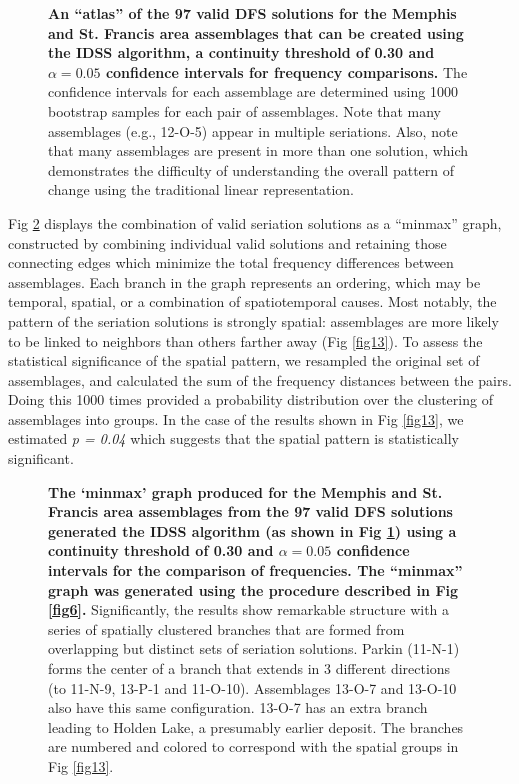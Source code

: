 \documentclass[10pt,letterpaper]{article}
\begin{document}
\begin{figure}[h]
\caption{{\bf An ``atlas'' of the 97 valid DFS solutions for the Memphis and St. Francis area assemblages that can be created using the IDSS algorithm, a continuity threshold of 0.30 and $\alpha = 0.05$ confidence intervals for frequency comparisons.} The confidence intervals for each assemblage are determined using 1000 bootstrap samples for each pair of assemblages. Note that many assemblages (e.g., 12-O-5) appear in multiple seriations.  Also, note that many assemblages are present in more than one solution, which demonstrates the difficulty of understanding the overall pattern of change using the traditional linear representation.}
\label{fig11}
\end{figure}

Fig \ref{fig12} displays the combination of valid seriation solutions as a ``minmax'' graph, constructed by combining individual valid solutions and retaining those connecting edges which minimize the total frequency differences between assemblages. Each branch in the graph represents an ordering, which may be temporal, spatial, or a combination of spatiotemporal causes.  Most notably, the pattern of the seriation solutions is strongly spatial: assemblages are more likely to be linked to neighbors than others farther away (Fig \ref{fig13}). To assess the statistical significance of the spatial pattern, we resampled the original set of assemblages, and calculated the sum of the frequency distances between the pairs. Doing this 1000 times provided a probability distribution over the clustering of assemblages into groups. In the case of the results shown in Fig \ref{fig13}, we estimated \textit{p = 0.04} which suggests that the spatial pattern is statistically significant.

\begin{figure}[h]
\caption{{\bf The `minmax' graph produced for the Memphis and St. Francis area assemblages from the 97 valid DFS solutions generated the IDSS algorithm (as shown in Fig \ref{fig11}) using a continuity threshold of 0.30 and $\alpha = 0.05$ confidence intervals for the comparison of frequencies. The ``minmax'' graph was generated using the procedure described in Fig \ref{fig6}.} Significantly, the results show remarkable structure with a series of spatially clustered branches that are formed from overlapping but distinct sets of seriation solutions. Parkin (11-N-1) forms the center of a branch that extends in 3 different directions (to 11-N-9, 13-P-1 and 11-O-10). Assemblages 13-O-7 and 13-O-10 also have this same configuration. 13-O-7 has an extra branch leading to Holden Lake, a presumably earlier deposit. The branches are numbered and colored to correspond with the spatial groups in Fig \ref{fig13}. }
\label{fig12}
\end{figure}
\end{document}
